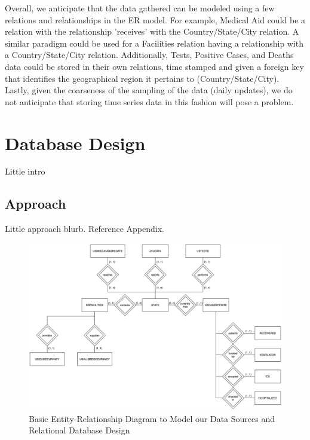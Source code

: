 \documentclass[11pt]{article}
\begin{document}
\noindent
Overall, we anticipate that the data gathered can be modeled using a few relations and relationships in the ER model. For example, Medical Aid could be a relation with the relationship 'receives' with the Country/State/City relation. A similar paradigm could be used for a Facilities relation having a relationship with a Country/State/City relation. Additionally, Tests, Positive Cases, and Deaths data could be stored in their own relations, time stamped and given a foreign key that identifies the geographical region it pertains to (Country/State/City). Lastly, given the coarseness of the sampling of the data (daily updates), we do not anticipate that storing time series data in this fashion will pose a problem.



\pagebreak

\section{Database Design}

\noindent
Little intro

\subsection{Approach}

\noindent
Little approach blurb. Reference Appendix.

\FloatBarrier
\begin{figure}[h]
    \centering
    \includegraphics[width=\textwidth]{diagrams/ER1.png}
    \caption{Basic Entity-Relationship Diagram to Model our Data Sources and Relational Database Design}
    \label{fig:er2}
\end{figure}
\FloatBarrier
\end{document}
